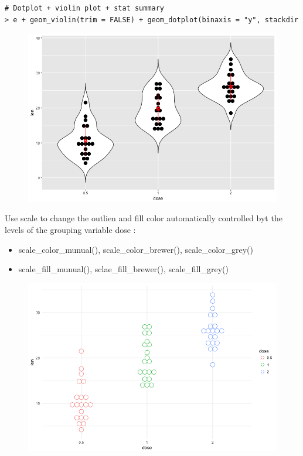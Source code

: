 \begin{lstlisting}[language=html]
# Dotplot + violin plot + stat summary
> e + geom_violin(trim = FALSE) + geom_dotplot(binaxis = "y", stackdir ="center") + stat_summary(fun.data = "mean_sdl", fun.args = list(mult = 1), geom = "pointrange", color = "red", shape = 11)
\end{lstlisting}
\begin{figure}[H]\begin{center}\includegraphics[scale=1 ]{ilu/bg107.png}\end{center}\end{figure}

Use scale to change the outlien and fill color automatically controlled byt the levels of the grouping variable dose : 
\begin{itemize}
  \item scale\_color\_munual(), scale\_color\_brewer(), scale\_color\_grey()
  \item scale\_fill\_munual(), sclae\_fill\_brewer(), scale\_fill\_grey()
\end{itemize}
 
\begin{figure}[H]\begin{center}\includegraphics[scale=1 ]{ilu/bg108.png}\end{center}\end{figure} 

